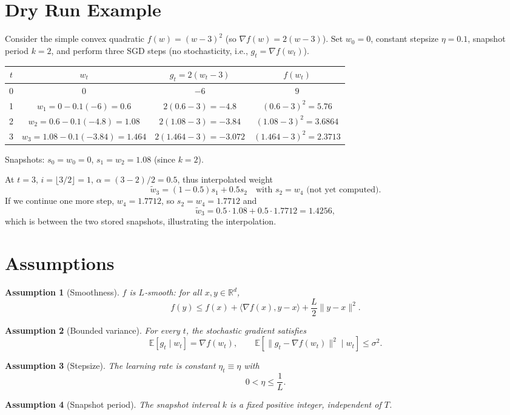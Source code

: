 \documentclass{article}
\newtheorem{assumption}{Assumption}
\begin{document}
\section*{Dry Run Example}
Consider the simple convex quadratic $f(w)=(w-3)^2$ (so $\nabla f(w)=2(w-3)$).  
Set $w_0=0$, constant stepsize $\eta=0.1$, snapshot period $k=2$, and perform three SGD steps (no stochasticity, i.e., $g_t=\nabla f(w_t)$).

\begin{center}
\begin{tabular}{c|c|c|c}
$t$ & $w_t$ & $g_t=2(w_t-3)$ & $f(w_t)$ \\ \hline
0 & $0$ & $-6$ & $9$ \\
1 & $w_1=0-0.1(-6)=0.6$ & $2(0.6-3)=-4.8$ & $(0.6-3)^2=5.76$\\
2 & $w_2=0.6-0.1(-4.8)=1.08$ & $2(1.08-3)=-3.84$ & $(1.08-3)^2=3.6864$\\
3 & $w_3=1.08-0.1(-3.84)=1.464$ & $2(1.464-3)=-3.072$ & $(1.464-3)^2=2.3713$
\end{tabular}
\end{center}

Snapshots: $s_0=w_0=0$, $s_1=w_2=1.08$ (since $k=2$).  

At $t=3$, $i=\lfloor 3/2\rfloor=1$, $\alpha=(3-2)/2=0.5$, thus interpolated weight
\[
\tilde w_3=(1-0.5)s_1+0.5 s_2\quad\text{with }s_2=w_4\text{ (not yet computed)}.
\]
If we continue one more step, $w_4=1.7712$, so $s_2=w_4=1.7712$ and
\[
\tilde w_3=0.5\cdot1.08+0.5\cdot1.7712=1.4256,
\]
which is between the two stored snapshots, illustrating the interpolation.

\section*{Assumptions}
\begin{assumption}[Smoothness]\label{as:smooth}
$f$ is $L$‑smooth: for all $x,y\in\mathbb{R}^d$,
\[
f(y)\le f(x)+\langle\nabla f(x),y-x\rangle+\frac{L}{2}\|y-x\|^2 .
\tag{A1}
\]
\end{assumption}
\begin{assumption}[Bounded variance]\label{as:var}
For every $t$, the stochastic gradient satisfies
\[
\mathbb{E}[g_t\mid w_t]=\nabla f(w_t),\qquad
\mathbb{E}\!\left[\|g_t-\nabla f(w_t)\|^2\mid w_t\right]\le\sigma^2 .
\tag{A2}
\]
\end{assumption}
\begin{assumption}[Stepsize]\label{as:step}
The learning rate is constant $\eta_t\equiv\eta$ with
\[
0<\eta\le\frac{1}{L}.
\tag{A3}
\]
\end{assumption}
\begin{assumption}[Snapshot period]\label{as:k}
The snapshot interval $k$ is a fixed positive integer, independent of $T$.
\end{assumption}
\end{document}

